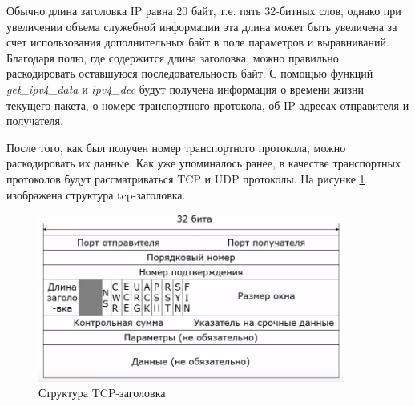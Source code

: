 \documentclass[bachelor, och, coursework]{SCWorks}
\begin{document}
    Обычно длина заголовка IP равна 20 байт, т.е. пять 32-битных слов, однако при увеличении объема служебной информации эта длина может быть увеличена
    за счет использования дополнительных байт в поле параметров и выравниваний. Благодаря полю, где содержится
    длина заголовка, можно правильно раскодировать оставшуюся последовательность байт. С помощью функций \textit{get\_ipv4\_data} и \textit{ipv4\_dec}
    будут получена информация о времени жизни текущего пакета, о номере транспортного протокола, об IP-адресах отправителя и получателя.
  
      
      
      

    После того, как был получен номер транспортного протокола, можно раскодировать их данные. Как уже упоминалось ранее,
    в качестве транспортных протоколов будут рассматриваться TCP и UDP протоколы. На рисунке \ref{tcp-header} изображена структура tcp-заголовка.
  
    \begin{figure}[H]
      \centering
      \includegraphics[width=0.9\textwidth]{photo/tcp-segment.jpg}
      \caption{Структура TCP-заголовка}
      \label{tcp-header}
    \end{figure}
    
\end{document}
